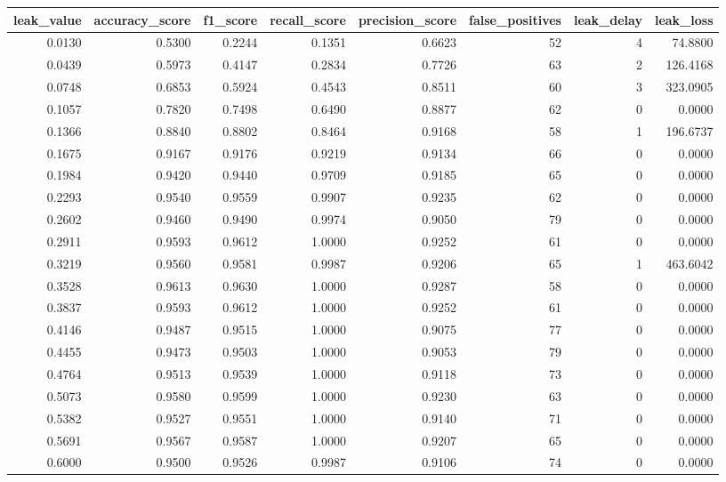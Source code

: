 \begin{tabular}{rrrrrrrr}
\toprule
leak\_value & accuracy\_score & f1\_score & recall\_score & precision\_score & false\_positives & leak\_delay & leak\_loss \\
\midrule
0.0130 & 0.5300 & 0.2244 & 0.1351 & 0.6623 & 52 & 4 & 74.8800 \\
0.0439 & 0.5973 & 0.4147 & 0.2834 & 0.7726 & 63 & 2 & 126.4168 \\
0.0748 & 0.6853 & 0.5924 & 0.4543 & 0.8511 & 60 & 3 & 323.0905 \\
0.1057 & 0.7820 & 0.7498 & 0.6490 & 0.8877 & 62 & 0 & 0.0000 \\
0.1366 & 0.8840 & 0.8802 & 0.8464 & 0.9168 & 58 & 1 & 196.6737 \\
0.1675 & 0.9167 & 0.9176 & 0.9219 & 0.9134 & 66 & 0 & 0.0000 \\
0.1984 & 0.9420 & 0.9440 & 0.9709 & 0.9185 & 65 & 0 & 0.0000 \\
0.2293 & 0.9540 & 0.9559 & 0.9907 & 0.9235 & 62 & 0 & 0.0000 \\
0.2602 & 0.9460 & 0.9490 & 0.9974 & 0.9050 & 79 & 0 & 0.0000 \\
0.2911 & 0.9593 & 0.9612 & 1.0000 & 0.9252 & 61 & 0 & 0.0000 \\
0.3219 & 0.9560 & 0.9581 & 0.9987 & 0.9206 & 65 & 1 & 463.6042 \\
0.3528 & 0.9613 & 0.9630 & 1.0000 & 0.9287 & 58 & 0 & 0.0000 \\
0.3837 & 0.9593 & 0.9612 & 1.0000 & 0.9252 & 61 & 0 & 0.0000 \\
0.4146 & 0.9487 & 0.9515 & 1.0000 & 0.9075 & 77 & 0 & 0.0000 \\
0.4455 & 0.9473 & 0.9503 & 1.0000 & 0.9053 & 79 & 0 & 0.0000 \\
0.4764 & 0.9513 & 0.9539 & 1.0000 & 0.9118 & 73 & 0 & 0.0000 \\
0.5073 & 0.9580 & 0.9599 & 1.0000 & 0.9230 & 63 & 0 & 0.0000 \\
0.5382 & 0.9527 & 0.9551 & 1.0000 & 0.9140 & 71 & 0 & 0.0000 \\
0.5691 & 0.9567 & 0.9587 & 1.0000 & 0.9207 & 65 & 0 & 0.0000 \\
0.6000 & 0.9500 & 0.9526 & 0.9987 & 0.9106 & 74 & 0 & 0.0000 \\
\bottomrule
\end{tabular}

